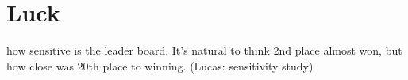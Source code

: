 \section{Luck}
how sensitive is the leader board. It's natural to think 2nd place almost won, but how close was 20th place to winning. (Lucas: sensitivity study)
